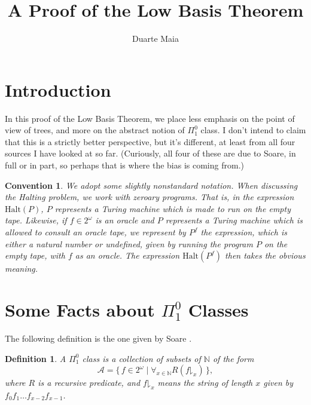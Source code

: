 \documentclass{article}
\title{A Proof of the Low Basis Theorem}
\author{Duarte Maia}
\newtheorem{definition}[theorem]{Definition}
\theoremstyle{nonumberplain}
\newtheorem{convention}{Convention}
\newcommand{\N}{\mathbb{N}}
\newcommand{\halt}{\mathrm{Halt}}
\newcommand{\cl}[1]{\mathcal{#1}}
\newcommand{\take}[2]{#1\mathord{\downharpoonright}_{#2}}
\begin{document}
\maketitle

\section{Introduction}

In this proof of the Low Basis Theorem, we place less emphasis on the point of view of trees, and more on the abstract notion of $\Pi^0_1$ class. I don't intend to claim that this is a strictly better perspective, but it's different, at least from all four sources I have looked at so far. \cite{soare1, soare2, jockushsoare, pi01classes} (Curiously, all four of these are due to Soare, in full or in part, so perhaps that is where the bias is coming from.)

\begin{convention}
We adopt some slightly nonstandard notation. When discussing the Halting problem, we work with zeroary programs. That is, in the expression $\halt(P)$, $P$ represents a Turing machine which is made to run on the empty tape. Likewise, if $f \in 2^\omega$ is an oracle and $P$ represents a Turing machine which is allowed to consult an oracle tape, we represent by $P^f$ the expression, which is either a natural number or undefined, given by running the program $P$ on the empty tape, with $f$ as an oracle. The expression $\halt(P^f)$ then takes the obvious meaning.
\end{convention}

\section{Some Facts about $\Pi^0_1$ Classes}

The following definition is the one given by Soare \cite{soare2}.

\begin{definition}
A $\Pi^0_1$ class is a collection of subsets of $\N$ of the form
\begin{equation}
\cl A = \{\, f \in 2^\omega \mid \forall_{x \in \N} R(\take f x) \,\},
\end{equation}
where $R$ is a recursive predicate, and $\take f x$ means the string of length $x$ given by $f_0 f_1 \dots f_{x-2} f_{x-1}$.
\end{definition}
\end{document}
